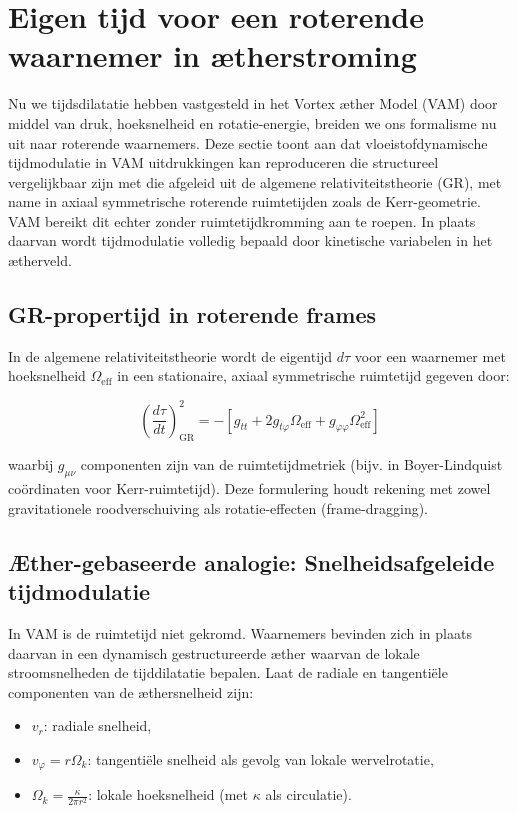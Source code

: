\section{Eigen tijd voor een roterende waarnemer in ætherstroming}

Nu we tijdsdilatatie hebben vastgesteld in het Vortex æther Model (VAM) door middel van druk, hoeksnelheid en rotatie-energie, breiden we ons formalisme nu uit naar roterende waarnemers. Deze sectie toont aan dat vloeistofdynamische tijdmodulatie in VAM uitdrukkingen kan reproduceren die structureel vergelijkbaar zijn met die afgeleid uit de algemene relativiteitstheorie (GR), met name in axiaal symmetrische roterende ruimtetijden zoals de Kerr-geometrie. VAM bereikt dit echter zonder ruimtetijdkromming aan te roepen. In plaats daarvan wordt tijdmodulatie volledig bepaald door kinetische variabelen in het ætherveld.

\subsection{GR-propertijd in roterende frames}

In de algemene relativiteitstheorie wordt de eigentijd \(d\tau\) voor een waarnemer met hoeksnelheid \(\Omega_{\text{eff}}\) in een stationaire, axiaal symmetrische ruimtetijd gegeven door:

\begin{equation}
\left( \frac{d\tau}{dt} \right)^2_{\text{GR}} = -\left[ g_{tt} + 2g_{t\varphi} \Omega_{\text{eff}} + g_{\varphi\varphi} \Omega_{\text{eff}}^2 \right]
\label{eq:GR_proper_time}
\end{equation}

waarbij \(g_{\mu\nu}\) componenten zijn van de ruimtetijdmetriek (bijv. in Boyer-Lindquist coördinaten voor Kerr-ruimtetijd). Deze formulering houdt rekening met zowel gravitationele roodverschuiving als rotatie-effecten (frame-dragging).

\subsection{Æther-gebaseerde analogie: Snelheidsafgeleide tijdmodulatie}

In VAM is de ruimtetijd niet gekromd. Waarnemers bevinden zich in plaats daarvan in een dynamisch gestructureerde æther waarvan de lokale stroomsnelheden de tijddilatatie bepalen. Laat de radiale en tangentiële componenten van de æthersnelheid zijn:

\begin{itemize}
\item \(v_r\): radiale snelheid,
\item \(v_\varphi = r\Omega_k\): tangentiële snelheid als gevolg van lokale wervelrotatie,
\item \(\Omega_k = \frac{\kappa}{2\pi r^2}\): lokale hoeksnelheid (met \(\kappa\) als circulatie).
\end{itemize}

